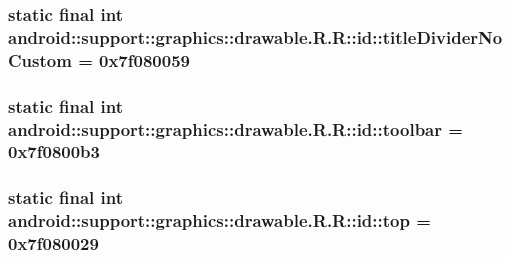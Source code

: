 \hypertarget{classandroid_1_1support_1_1graphics_1_1drawable_1_1_r_1_1id_16ed55c9640ec6a447bc1920e94de5fc}{
\subsubsection[{titleDividerNoCustom}]{\setlength{\rightskip}{0pt plus 5cm}static final int android::support::graphics::drawable.R.R::id::titleDividerNoCustom = 0x7f080059}}
\label{classandroid_1_1support_1_1graphics_1_1drawable_1_1_r_1_1id_16ed55c9640ec6a447bc1920e94de5fc}


\hypertarget{classandroid_1_1support_1_1graphics_1_1drawable_1_1_r_1_1id_7b5576da6cda63aa7b986a8c4d254727}{
\subsubsection[{toolbar}]{\setlength{\rightskip}{0pt plus 5cm}static final int android::support::graphics::drawable.R.R::id::toolbar = 0x7f0800b3}}
\label{classandroid_1_1support_1_1graphics_1_1drawable_1_1_r_1_1id_7b5576da6cda63aa7b986a8c4d254727}


\hypertarget{classandroid_1_1support_1_1graphics_1_1drawable_1_1_r_1_1id_ac3970c0422217f537228f46443d9d9d}{
\subsubsection[{top}]{\setlength{\rightskip}{0pt plus 5cm}static final int android::support::graphics::drawable.R.R::id::top = 0x7f080029}}
\label{classandroid_1_1support_1_1graphics_1_1drawable_1_1_r_1_1id_ac3970c0422217f537228f46443d9d9d}


